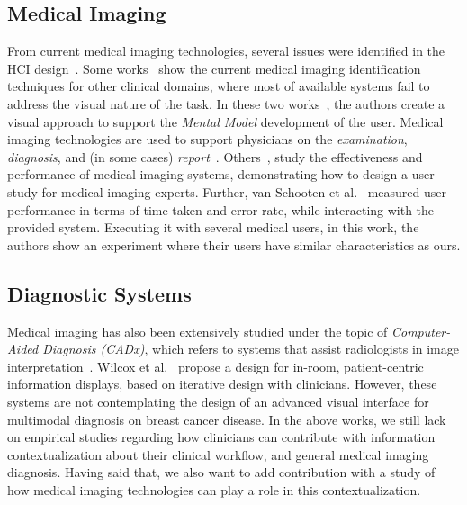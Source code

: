 \subsection{Medical Imaging}

From current medical imaging technologies, several issues were identified in the HCI design~\cite{Calisto:2017:TTM:3132272.3134111, Igarashi:2016:IVS:2984511.2984537}.
Some works~\cite{Balducci:2018:BQA:3206505.3206555, Rosado:2015:NFS:2826165.2826213} show the current medical imaging identification techniques for other clinical domains, where most of available systems fail to address the visual nature of the task.
In these two works~\cite{Balducci:2018:BQA:3206505.3206555, Rosado:2015:NFS:2826165.2826213}, the authors create a visual approach to support the \textit{Mental Model} development of the user.
Medical imaging technologies are used to support physicians on the \textit{examination}, \textit{diagnosis}, and (in some cases) \textit{report}~\cite{10.1145/2639189.2639256}.
Others~\cite{10.1145/1385569.1385651, 10.1145/1842993.1843023}, study the effectiveness and performance of medical imaging systems, demonstrating how to design a user study for medical imaging experts.
Further, van Schooten et al.~\cite{10.1145/1842993.1843023} measured user performance in terms of time taken and error rate, while interacting with the provided system.
Executing it with several medical users, in this work, the authors show an experiment where their users have similar characteristics as ours.

\subsection{Diagnostic Systems}

Medical imaging has also been extensively studied under the topic of \textit{Computer-Aided Diagnosis (CADx)}, which refers to systems that assist radiologists in image interpretation~\cite{Oram:2014:CDR:2598510.2598585, Molin:2016:UDA:2971485.2971561}.
Wilcox et al.~\cite{Wilcox:2010:DPI:1753326.1753650} propose a design for in-room, patient-centric information displays, based on iterative design with clinicians.
However, these systems are not contemplating the design of an advanced visual interface for multimodal diagnosis on breast cancer disease.
In the above works, we still lack on empirical studies regarding how clinicians can contribute with information contextualization about their clinical workflow, and general medical imaging diagnosis.
Having said that, we also want to add contribution with a study of how medical imaging technologies can play a role in this contextualization.